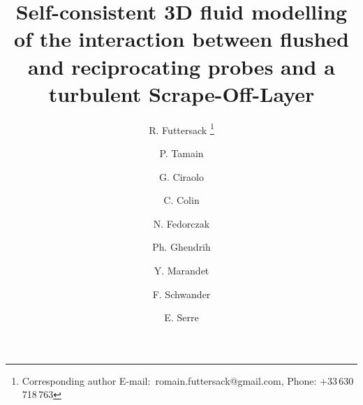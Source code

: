 \documentclass[cpp,a4paper,fleqn,twoside%
]{w-art}
\begin{document}



\title[3D flushed/reciprocating probes modelling]{Self-consistent 3D fluid
modelling of the interaction between flushed and reciprocating probes and a turbulent Scrape-Off-Layer}


\author[R. Futtersack]{R. Futtersack%
  \footnote{Corresponding author\quad
  E-mail:~\textsf{romain.futtersack@gmail.com}, Phone: +33\,630\,718\,763}}
\address[\inst{1}]{CEA-IRFM, F-13108 Saint-Paul-lez-Durance, France}
\author[P. Tamain]{P. Tamain}

\author[al.]{G. Ciraolo}
\author[C. Colin]{C. Colin}
\address[\inst{2}]{Aix-Marseille Universit\'e, CNRS, Centrale Marseille, M2P2
UMR 7340, 13451 Marseille, France}
\author[]{N. Fedorczak}
\author[]{Ph. Ghendrih}
\author[]{Y. Marandet}
\author[]{F. Schwander}
\author[]{E. Serre}
\end{document}
